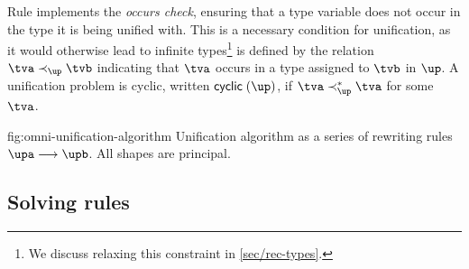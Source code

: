 \documentclass[acmsmall,screen,nonacm,review]{acmart}
\begin{document}


Rule  implements the \emph{occurs check}, ensuring that a type
variable does not occur in the type it is being unified with. This is a
necessary condition for unification, as it would otherwise lead to infinite
types\footnote{We discuss relaxing this constraint in \cref{sec/rec-types}.}
is defined by the relation $\tv \prec_\up \tvb$ indicating that $\tv$ occurs
in a type assigned to $\tvb$ in $\up$. A unification problem is cyclic,
written $\cyclic \up$, if $\tv \prec_\up^* \tv$ for some $\tv$.

\begin{mathparfig}[t]
  {fig:omni-unification-algorithm}
  {Unification algorithm as a series of rewriting rules
   $\upa \unif \upb$. All shapes are principal.}
   \rewrite[U-Exists]
      {(\cexists \alpha \upa) \cand \upb \\ \tv \disjoint \upb}
      {\cexists \tv {\upa \cand \upb}}

    \rewrite[U-Cycle]
      {\up \\ \cyclic \up}
      {\cfalse}

    \rewrite[U-True]
      {\up \cand \ctrue}
      {\up}

    \rewrite[U-False]
      {\up \cand \cfalse}
      {\cfalse}

    \rewrite[U-Merge]
      {\cunif \tv \ueqa \cand \cunif \tv \ueqb}
      {\cunif \tv {\cunif \ueqa \ueqb}}

    \rewrite[U-Stutter]
      {\cunif \tv {\cunif \tv \ueq}}
      {\cunif \tv \ueq}

    \rewrite[U-Name]
      {\cunif {\pshapp \tys[\ti]} \ueq \\ \tv \disjoint \tys, \ueq }
      {\cexists \tv {\cunif \tv \ti \cand \cunif {\pshapp \tys[\tv] } \ueq}}

    \rewrite[U-Decomp]
      {\cunif {\pshapp \tvs} {\cunif {\pshapp \tvbs} \ueq}}
      {\cunif {\pshapp \tvs} \ueq \cand \cunif \tvs \tvbs}

    \rewrite[U-Clash]
      {\cunif {\pshapp \tvs} {\cunif {\pshapp[\shp]\tvbs } \ueq }\\
       \sh \neq \shp}
      {\cfalse}

    \rewrite[U-Trivial]
      {\trivial \ueq}
      {\ctrue}
\end{mathparfig}


\subsection{Solving rules}
\end{document}
